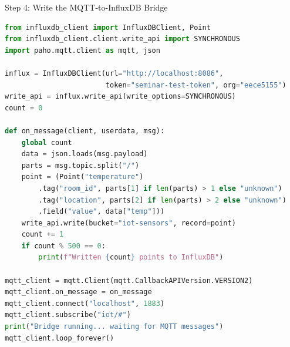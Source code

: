\documentclass[aspectratio=169,11pt]{beamer}
\begin{document}
\begin{frame}[fragile]{Step 4: Write the MQTT-to-InfluxDB Bridge}

    \vspace{-0.05cm}
\begin{lstlisting}[language=Python,basicstyle=\ttfamily\tiny]
from influxdb_client import InfluxDBClient, Point
from influxdb_client.client.write_api import SYNCHRONOUS
import paho.mqtt.client as mqtt, json

influx = InfluxDBClient(url="http://localhost:8086",
                        token="seminar-test-token", org="eece5155")
write_api = influx.write_api(write_options=SYNCHRONOUS)
count = 0

def on_message(client, userdata, msg):
    global count
    data = json.loads(msg.payload)
    parts = msg.topic.split("/")
    point = (Point("temperature")
        .tag("room_id", parts[1] if len(parts) > 1 else "unknown")
        .tag("location", parts[2] if len(parts) > 2 else "unknown")
        .field("value", data["temp"]))
    write_api.write(bucket="iot-sensors", record=point)
    count += 1
    if count % 500 == 0:
        print(f"Written {count} points to InfluxDB")

mqtt_client = mqtt.Client(mqtt.CallbackAPIVersion.VERSION2)
mqtt_client.on_message = on_message
mqtt_client.connect("localhost", 1883)
mqtt_client.subscribe("iot/#")
print("Bridge running... waiting for MQTT messages")
mqtt_client.loop_forever()
\end{lstlisting}
\end{frame}
\end{document}
